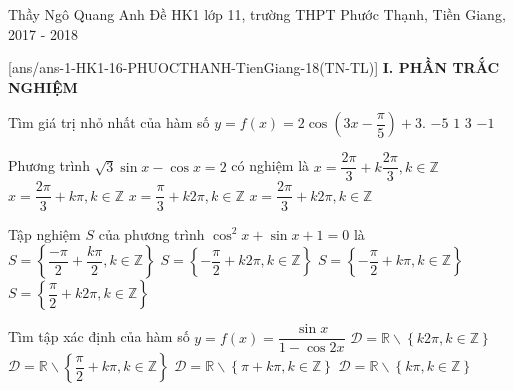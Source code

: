 	\begin{name}
		{Thầy Ngô Quang Anh}
		{Đề HK1 lớp 11, trường THPT Phước Thạnh, Tiền Giang, 2017 - 2018}
	\end{name}
	\setcounter{ex}{0}\setcounter{bt}{0}
	[ans/ans-1-HK1-16-PHUOCTHANH-TienGiang-18(TN-TL)]
	\noindent\textbf{I. PHẦN TRẮC NGHIỆM}
\begin{ex}%
	Tìm giá trị nhỏ nhất của hàm số $ y=f(x)=2\cos \left( 3x-\dfrac{\pi}{5}\right) +3.$
	\choice
	{$ -5 $}
	{\True $ 1 $}
	{$ 3 $}
	{$ -1 $}
\end{ex}

\begin{ex}%
	Phương trình $\sqrt{3}\sin x-\cos x=2$ có nghiệm là
	\choice
	{$x=\dfrac{2\pi}{3}+k\dfrac{2\pi}{3},k\in \mathbb{Z}$}
	{$x=\dfrac{2\pi}{3}+k\pi,k\in \mathbb{Z}$}
	{$x=\dfrac{\pi}{3}+k2\pi,k\in \mathbb{Z}$}
	{\True $x=\dfrac{2\pi}{3}+k2\pi,k\in \mathbb{Z}$}
\end{ex}

\begin{ex}%
		Tập nghiệm $S$ của phương trình $\cos^2x+\sin x+1=0$ là
		\choice
		{$S=\left\{\dfrac{-\pi}{2}+\dfrac{k\pi}{2},k\in \mathbb{Z}\right\}$}
		{\True $S=\left\{-\dfrac{\pi}{2}+k2\pi, k\in \mathbb{Z}\right\}$}
		{$S=\left\{-\dfrac{\pi}{2}+k\pi, k\in \mathbb{Z}\right\}$}
		{$S=\left\{\dfrac{\pi}{2}+k2\pi, k\in \mathbb{Z}\right\}$}
	\end{ex}

\begin{ex}%
		Tìm tập xác định của hàm số $y=f(x)=\dfrac{\sin x}{1-\cos 2x}$ 
		\choice
		{$\mathscr{D} =\mathbb{R}\backslash \left\{k2\pi,k\in \mathbb{Z}\right\}$}
		{$\mathscr{D} =\mathbb{R}\backslash \left\{\dfrac{\pi}{2}+k\pi,k\in \mathbb{Z}\right\}$}
		{$\mathscr{D} =\mathbb{R}\backslash \left\{\pi+k\pi,k\in \mathbb{Z}\right\}$}
		{\True $\mathscr{D} =\mathbb{R}\backslash \left\{k\pi,k\in \mathbb{Z}\right\}$}
	\end{ex}

